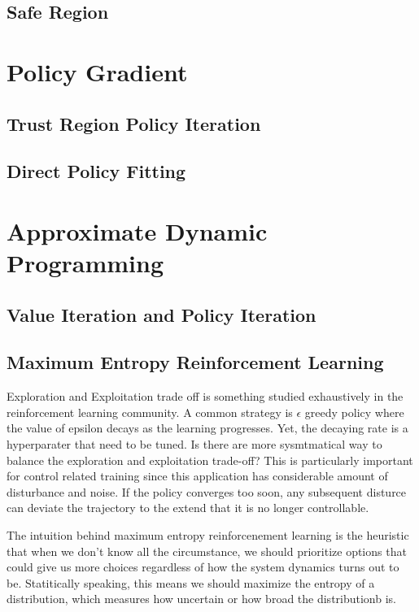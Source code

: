 \documentclass[journal]{IEEEtran}
\begin{document}
\subsection{Safe Region}


\section{Policy Gradient}
\subsection{Trust Region Policy Iteration}
\subsection{Direct Policy Fitting}

\section{Approximate Dynamic Programming}









\subsection{Value Iteration and Policy Iteration}
\subsection{Maximum Entropy Reinforcement Learning}
Exploration and Exploitation trade off is something studied exhaustively in the reinforcement learning community. A common strategy is $\epsilon$ greedy policy where the value of epsilon decays as the learning progresses. Yet, the decaying rate is a hyperparater that need to be tuned. Is there are more sysmtmatical way to balance the exploration and exploitation trade-off? This is particularly important for control related training since this application has considerable amount of disturbance and noise. If the policy converges too soon, any subsequent disturce can deviate the trajectory to the extend that it is no longer controllable.

The intuition behind maximum entropy reinforcenement learning is the heuristic that when we don't know all the circumstance, we should prioritize options that could give us more choices regardless of how the system dynamics turns out to be. Statitically speaking, this means we should maximize the entropy of a distribution, which measures how uncertain or how broad the distributionb is.
\end{document}
